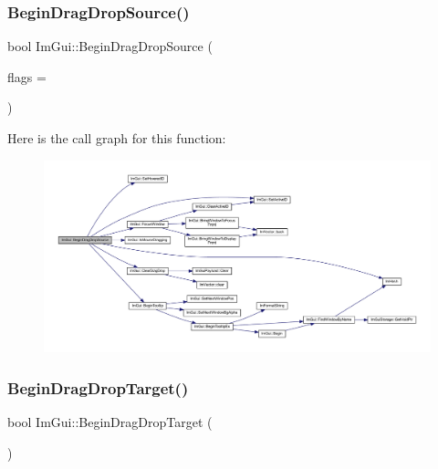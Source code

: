 \subsubsection{\texorpdfstring{Begin\+Drag\+Drop\+Source()}{BeginDragDropSource()}}
{\footnotesize\ttfamily bool Im\+Gui\+::\+Begin\+Drag\+Drop\+Source (\begin{DoxyParamCaption}\item[{\mbox{\hyperlink{imgui_8h_a4e54f95ded29d2584125d116df22e430}{Im\+Gui\+Drag\+Drop\+Flags}}}]{flags = {} }\end{DoxyParamCaption})}

Here is the call graph for this function\+:
\nopagebreak
\begin{figure}[H]
\begin{center}
\leavevmode
\includegraphics[width=350pt]{namespace_im_gui_ac2609b0f034d3bcd8d70d26df8694eaa_cgraph}
\end{center}
\end{figure}
\mbox{\label{namespace_im_gui_ac42384c3181406bbd0f3f4f77a73c7ed}} 
\subsubsection{\texorpdfstring{Begin\+Drag\+Drop\+Target()}{BeginDragDropTarget()}}
{\footnotesize\ttfamily bool Im\+Gui\+::\+Begin\+Drag\+Drop\+Target (\begin{DoxyParamCaption}{ }\end{DoxyParamCaption})}

\mbox{\label{namespace_im_gui_a929a420d3af29051a140d0f36addbcd2}} 
